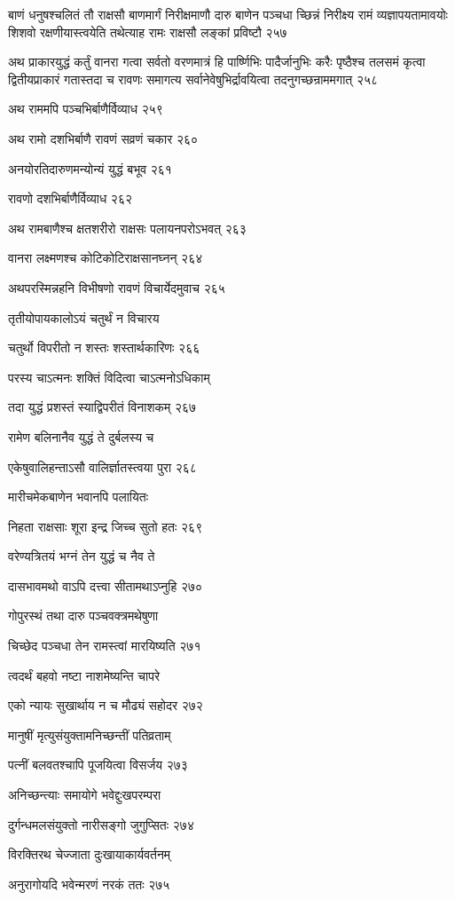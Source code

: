 बाणं धनुषश्चलितं तौ राक्षसौ बाणमार्गं निरीक्षमाणौ दारु बाणेन पञ्चधा च्छिन्नं निरीक्ष्य
रामं व्यज्ञापयतामावयोः शिशवो रक्षणीयास्त्वयेति तथेत्याह रामः राक्षसौ लङ्कां प्रविष्टौ
 २५७

अथ प्राकारयुद्धं कर्तुं वानरा गत्वा सर्वतो वरणमात्रं हि पार्ष्णिभिः पादैर्जानुभिः करैः
पृष्ठैश्च तलसमं कृत्वा द्वितीयप्राकारं गतास्तदा च रावणः समागत्य सर्वानेवेषुभिर्द्रावयित्वा
तदनुगच्छन्राममगात् २५८

अथ राममपि पञ्चभिर्बाणैर्विव्याध २५९

अथ रामो दशभिर्बाणै रावणं सव्रणं चकार २६०

अनयोरतिदारुणमन्योन्यं युद्धं बभूव २६१

रावणो दशभिर्बाणैर्विव्याध २६२

अथ रामबाणैश्च क्षतशरीरो राक्षसः पलायनपरोऽभवत् २६३

वानरा लक्ष्मणश्च कोटिकोटिराक्षसानघ्नन् २६४

अथपरस्मिन्नहनि विभीषणो रावणं विचार्येदमुवाच २६५

तृतीयोपायकालोऽयं चतुर्थं न विचारय

चतुर्थो विपरीतो न शस्तः शस्तार्थकारिणः २६६

परस्य चाऽत्मनः शक्तिं विदित्वा चाऽत्मनोऽधिकाम्

तदा युद्धं प्रशस्तं स्याद्विपरीतं विनाशकम् २६७

रामेण बलिनानैव युद्धं ते दुर्बलस्य च

एकेषुवालिहन्ताऽसौ वालिर्ज्ञातस्त्वया पुरा २६८

मारीचमेकबाणेन भवानपि पलायितः

निहता राक्षसाः शूरा इन्द्र जिच्च सुतो हतः २६९

वरेण्यत्रितयं भग्नं तेन युद्धं च नैव ते

दासभावमथो वाऽपि दत्त्वा सीतामथाऽप्नुहि २७०

गोपुरस्थं तथा दारु पञ्चवक्त्रमथेषुणा

चिच्छेद पञ्चधा तेन रामस्त्वां मारयिष्यति २७१

त्वदर्थं बहवो नष्टा नाशमेष्यन्ति चापरे

एको न्यायः सुखार्थाय न च मौढ्यं सहोदर २७२

मानुषीं मृत्युसंयुक्तामनिच्छन्तीं पतिव्रताम्

पत्नीं बलवतश्चापि पूजयित्वा विसर्जय २७३

अनिच्छन्त्याः समायोगे भवेद्दुःखपरम्परा

दुर्गन्धमलसंयुक्तो नारीसङ्गो जुगुप्सितः २७४

विरक्तिरथ चेज्जाता दुःखायाकार्यवर्तनम्

अनुरागोयदि भवेन्मरणं नरकं ततः २७५

